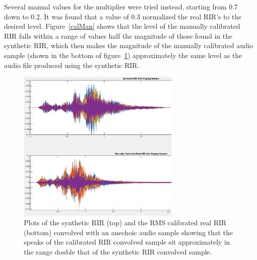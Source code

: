 \documentclass[../../main.tex]{subfiles}
\begin{document}

			Several manual values for the multiplier were tried instead, starting from 0.7 down to 0.2. It was found that a value of 0.3 normalized the real \ac{RIR}'s to the desired level. Figure~\ref{calMan} shows that the level of the manually calibrated RIR falls within a range of values half the magnitude of those found in the synthetic RIR, which then makes the magnitude of the manually calibrated audio sample (shown in the bottom of figure~\ref{calMansing}) approximately the same level as the audio file produced using the synthetic \ac{RIR}.			


			\begin{figure}[p]
				\begin{center}
					\includegraphics[width=0.7\textwidth]{Sections/Implementation/RealRIRs/images/calibration/CalMan_Sing_edit.png} 
					\caption{Plots of the synthetic \ac{RIR} (top) and the RMS calibrated real \ac{RIR} (bottom) convolved with an anechoic audio sample showing that the speaks of the calibrated \ac{RIR} convolved sample sit approximately in the range double that of the synthetic \ac{RIR} convolved sample.}
					\label{calMansing}
				\end{center}
			\end{figure}
\end{document}

